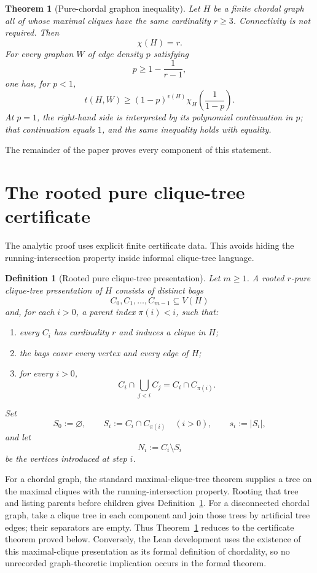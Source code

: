 \documentclass[11pt]{article}
\newtheorem{theorem}{Theorem}
\newtheorem{definition}{Definition}
\begin{document}
\begin{theorem}[Pure-chordal graphon inequality]\label{thm:main}
Let \(H\) be a finite chordal graph all of whose maximal cliques have the
same cardinality \(r\ge3\).  Connectivity is not required.  Then
\[
    \chi(H)=r.
\]
For every graphon \(W\) of edge density \(p\) satisfying
\[
    p\ge1-\frac1{r-1},
\]
one has, for \(p<1\),
\[
    \boxed{
    t(H,W)
    \ge
    (1-p)^{v(H)}
    \chi_H\!\left(\frac1{1-p}\right).
    }
\]
At \(p=1\), the right-hand side is interpreted by its polynomial
continuation in \(p\); that continuation equals \(1\), and the same inequality
holds with equality.
\end{theorem}

The remainder of the paper proves every component of this statement.

\section{The rooted pure clique-tree certificate}

The analytic proof uses explicit finite certificate data.  This avoids hiding
the running-intersection property inside informal clique-tree language.

\begin{definition}[Rooted pure clique-tree presentation]\label{def:certificate}
Let \(m\ge1\).  A rooted \(r\)-pure clique-tree presentation of \(H\) consists
of distinct bags
\[
    C_0,C_1,\dots,C_{m-1}\subseteq V(H)
\]
and, for each \(i>0\), a parent index \(\pi(i)<i\), such that:
\begin{enumerate}
    \item every \(C_i\) has cardinality \(r\) and induces a clique in \(H\);
    \item the bags cover every vertex and every edge of \(H\);
    \item for every \(i>0\),
    \begin{equation}\label{eq:old-separator}
        C_i\cap\bigcup_{j<i}C_j
        =
        C_i\cap C_{\pi(i)}.
    \end{equation}
\end{enumerate}
Set
\[
    S_0:=\varnothing,
    \qquad
    S_i:=C_i\cap C_{\pi(i)}\quad(i>0),
    \qquad
    s_i:=|S_i|,
\]
and let
\[
    N_i:=C_i\setminus S_i
\]
be the vertices introduced at step \(i\).
\end{definition}

For a chordal graph, the standard maximal-clique-tree theorem supplies a tree
on the maximal cliques with the running-intersection property.  Rooting that
tree and listing parents before children gives
Definition~\ref{def:certificate}.  For a disconnected chordal graph, take a
clique tree in each component and join those trees by artificial tree edges;
their separators are empty.  Thus Theorem~\ref{thm:main} reduces to the
certificate theorem proved below.  Conversely, the Lean development uses the
existence of this maximal-clique presentation as its formal definition of
chordality, so no unrecorded graph-theoretic implication occurs in the formal
theorem.
\end{document}
